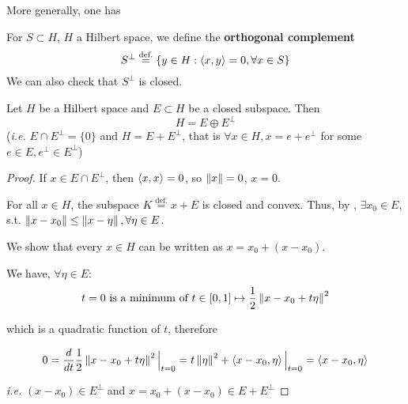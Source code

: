 \documentclass{article}
\begin{document}
More generally, one has  


\begin{definition}\nextline
    For $S\subset H$, $H$ a Hilbert space, we define the \textbf{orthogonal complement} 
    $$
    S^{\perp} \overset{\text{def.}}{=} \left\{y \in H: \left<{x},{y}\right>=0, \forall x \in S \right\}
    $$
    We can also check that $S^{\perp}$ is closed.  
\end{definition}  


\begin{corollary} \nextline
Let $H$ be a Hilbert space and $E \subset H$ be a closed subspace. Then  
$$
H = E \oplus E^{\perp}
$$  
(\textit{i.e.} $E \cap E^{\perp} = \{0\}$ and $H = E + E^{\perp}$, that is $\forall x \in H, x=e+ e^{\perp}$ for some $e \in E, e^{\perp} \in E^{\perp}$)
\end{corollary}

\begin{proof}
If $x \in E\cap E^{\perp}$, then $\left<{x},{x}\right>=0$, so $\left\|{x}\right\|=0$, $x=0$.  

For all $x\in H$, the subspace $K\overset{\text{def.}}{=}x+E$ is closed and convex. 
Thus, by , $\exists x_0 \in E$, s.t. $\left\|{x-x_0}\right\| \leq \left\|{x-\eta}\right\|, \forall \eta \in E$.
\begin{unexaminable}
    We show that every $x\in H$ can be written as $x=x_0+(x-x_0)$.
\end{unexaminable}

We have, $\forall \eta \in E$:  
\begin{equation*}
    t=0 \text{\ is\ a\ minimum\ of\ } t\in [0,1] \mapsto \frac{1}{2} \left\|{x-x_0+t\eta}\right\|^2
\end{equation*} 

which is a quadratic function of $t$, therefore  

\begin{equation*}
    0=\frac{d}{dt}\frac{1}{2} \left\|{x-x_0+t\eta}\right\|^2 \Big|_{t=0} = t\left\|{\eta}\right\|^2 + \left<{x-x_0},{\eta}\right> \Big|_{t=0}=\left<{x-x_0},{\eta}\right>
\end{equation*}

\textit{i.e.} $(x-x_0) \in E^{\perp}$ and $x=x_0+(x-x_0) \in E+E^{\perp}$
\end{proof}
\end{document}

